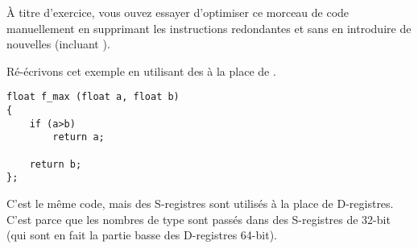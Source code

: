 \mysubparagraph{\Exercise}

À titre d'exercice, vous ouvez essayer d'optimiser ce morceau de code manuellement
en supprimant les instructions redondantes et sans en introduire de nouvelles (incluant
).


Ré-écrivons cet exemple en utilisant des \Tfloat à la place de \Tdouble.

\begin{lstlisting}[style=customc]
float f_max (float a, float b)
{
	if (a>b)
		return a;

	return b;
};
\end{lstlisting}



C'est le même code, mais des S-registres sont utilisés à la place de D-registres.
C'est parce que les nombres de type \Tfloat sont passés dans des S-registres de 32-bit
(qui sont en fait la partie basse des D-registres 64-bit).

